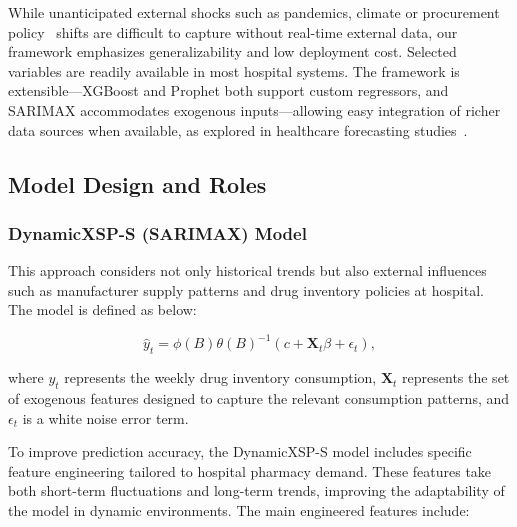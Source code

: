 \documentclass[12pt]{article}
\begin{document}
While unanticipated external shocks such as pandemics, climate or procurement policy~\cite{papadopoulos2024} shifts are difficult to capture without real-time external data, our framework emphasizes generalizability and low deployment cost. Selected variables are readily available in most hospital systems. The framework is extensible—XGBoost and Prophet both support custom regressors, and SARIMAX accommodates exogenous inputs—allowing easy integration of richer data sources when available, as explored in healthcare forecasting studies~\cite{li2023,zhang2021}.

\subsection{Model Design and Roles}
\subsubsection{DynamicXSP-S (SARIMAX) Model}

This approach considers not only historical trends but also external influences such as manufacturer supply patterns and drug inventory policies at hospital. The model is defined as below:

\begin{equation}
    \hat{y}_{t} = \phi(B)\theta(B)^{-1} \left( c + \mathbf{X}_{t}\beta + \epsilon_{t} \right),
\end{equation}

where \(y_{t}\) represents the weekly drug inventory consumption, \(\mathbf{X}_{t}\) represents the set of exogenous features designed to capture the relevant consumption patterns, and \(\epsilon_{t}\) is a white noise error term.

To improve prediction accuracy, the DynamicXSP-S model includes specific feature engineering tailored to hospital pharmacy demand. These features take both short-term fluctuations and long-term trends, improving the adaptability of the model in dynamic environments. The main engineered features include:
\end{document}
